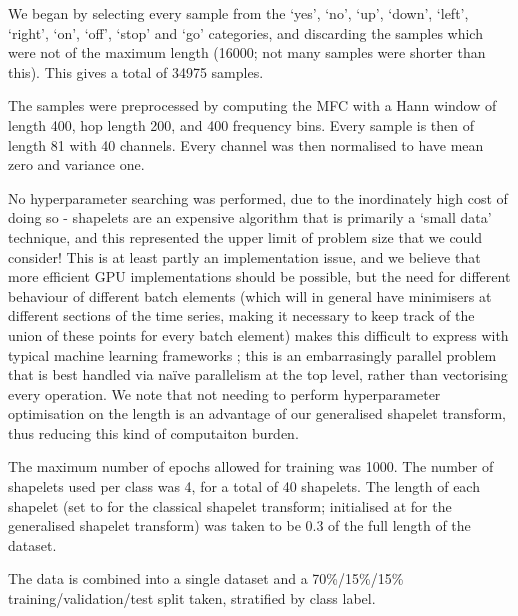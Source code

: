 \documentclass{article}
\theoremstyle{plain}
\theoremstyle{definition}
\begin{document}
	We began by selecting every sample from the `yes', `no', `up', `down', `left', `right', `on', `off', `stop' and `go' categories, and discarding the samples which were not of the maximum length (16000; not many samples were shorter than this). This gives a total of 34975 samples.
	
	The samples were preprocessed by computing the MFC with a Hann window of length 400, hop length 200, and 400 frequency bins. Every sample is then of length 81 with 40 channels. Every channel was then normalised to have mean zero and variance one.
	
	No hyperparameter searching was performed, due to the inordinately high cost of doing so - shapelets are an expensive algorithm that is primarily a `small data' technique, and this represented the upper limit of problem size that we could consider! This is at least partly an implementation issue, and we believe that more efficient GPU implementations should be possible, but the need for different behaviour of different batch elements (which will in general have minimisers at different sections of the time series, making it necessary to keep track of the union of these points for every batch element) makes this difficult to express with typical machine learning frameworks \cite{tensorflow, pytorch, jax}; this is an embarrasingly parallel problem that is best handled via na{\"i}ve parallelism at the top level, rather than vectorising every operation. We note that not needing to perform hyperparameter optimisation on the length is an advantage of our generalised shapelet transform, thus reducing this kind of computaiton burden.
	
	The maximum number of epochs allowed for training was 1000. The number of shapelets used per class was 4, for a total of 40 shapelets. The length of each shapelet (set to for the classical shapelet transform; initialised at for the generalised shapelet transform) was taken to be 0.3 of the full length of the dataset.
	
	The data is combined into a single dataset and a 70\%/15\%/15\% training/validation/test split taken, stratified by class label.
\end{document}
